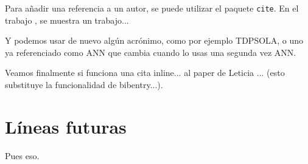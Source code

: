 \documentclass[spanish,openright]{book}
\begin{document}
Para añadir una referencia a un autor, se puede utilizar el paquete
\texttt{cite}. En el trabajo \cite{armani03}, se muestra un trabajo...

Y podemos usar de nuevo algún acrónimo, como por ejemplo \ac{TDPSOLA}, o
uno ya referenciado como \ac{ANN} que cambia cuando lo usas una
segunda vez \ac{ANN}.

Veamos finalmente si funciona una cita inline... al paper de Leticia ... (esto substituye la funcionalidad de bibentry...).


\section{Líneas futuras}
\label{sec:lineas-futuras}

Pues eso.
\end{document}
